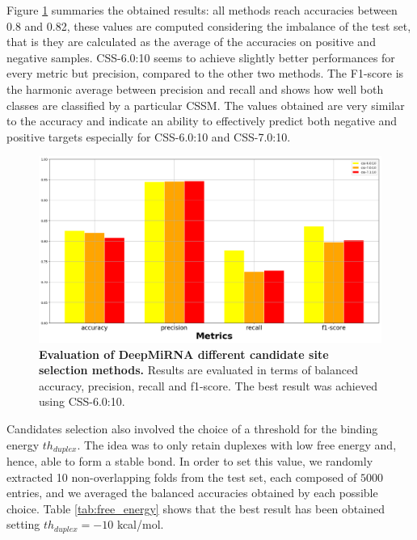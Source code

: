 Figure \ref{fig:cssm} summaries the obtained results: all methods reach accuracies between 0.8 and 0.82, these values are computed considering the imbalance of the test set, that is they are calculated as the average of the accuracies on positive and negative samples. CSS-6.0:10 seems to achieve slightly better performances for every metric but precision, compared to the other two methods. The F1-score is the harmonic average between precision and recall and shows how well both classes are classified by a particular CSSM. The values obtained are very similar to the accuracy and indicate an ability to effectively predict both negative and positive targets especially for CSS-6.0:10 and CSS-7.0:10.

\begin{figure}[hbt!]
	\centering
	\includegraphics[width=\textwidth]{Figures/cssm_evaluation}
	\caption{\textbf{Evaluation of DeepMiRNA different candidate site selection methods.} Results are evaluated in terms of balanced accuracy, precision, recall and f1-score. The best result was achieved using CSS-6.0:10.}
	\label{fig:cssm}
\end{figure}

Candidates selection also involved the choice of a threshold for the binding energy $th_{duplex}$.  The idea was to only retain duplexes with low free energy and, hence, able to form a stable bond. In order to set this value, we randomly extracted 10 non-overlapping folds from the test set, each composed of $5000$ entries, and we averaged the balanced accuracies obtained by each possible choice. Table \ref{tab:free_energy} shows that the best result has been obtained setting $th_{duplex} = -10$ kcal/mol. 

